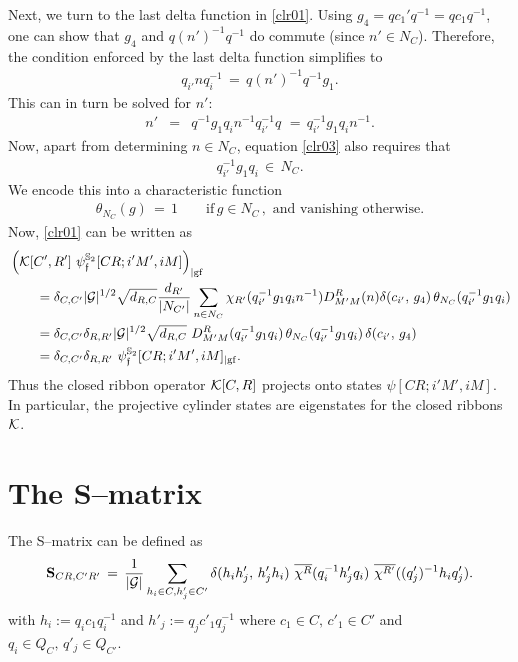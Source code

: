 \documentclass[nofootinbib,superscriptaddress,eqsecnum,tightenlines,11pt]{revtex4-1}
\def\nn{\nonumber}
\def\q{\qquad}
\def\mG{\mathcal{G}}
\def\ba{\begin{eqnarray}}
\def\ea{\end{eqnarray}}
\begin{document}
Next, we turn to the last delta function in \eqref{clr01}. Using $g_4=qc_1'q^{-1}=qc_1q^{-1}$, one can show that $g_4$ and $q(n')^{-1}q^{-1}$ do commute (since $n' \in N_C$). Therefore, the condition enforced by the last delta function simplifies to
\ba
q_{i'}nq_i^{-1}\,=\, q (n')^{-1} q^{-1} g_1.
\ea
This can in turn be solved for $n'$:
\ba\label{clr03}
n'&=& q^{-1} g_1 q_i n^{-1} q_{i'}^{-1}  q 
\,\,=\,  q_{i'}^{-1}  g_1 q_i n^{-1}   .
\ea
Now, apart from determining $n \in N_C$,  equation \eqref{clr03} also requires that 
\ba
q_{i'}^{-1}  g_1 q_i \,\in \, N_C  .
\ea
We encode this into a characteristic function
\ba
\theta_{N_C}( g)\,=\, 1 \q \text{if} \, g\in N_C\, ,  \text{ and vanishing otherwise.}
\ea
Now, \eqref{clr01} can be written as
\begin{align}
	&\left({\cal K}[C',R']\, \,\psi^{\mathbb{S}_2}_{\mathfrak f}[CR;i'M',iM] \right)_{|{\rm gf}}\\
	&\q  = \delta_{C,C'} |\mG|^{1/2}\sqrt{d_{R,C}} \frac{ d_{R'}} {|N_{C'}|} \sum_{n \in N_C}  \chi_{R'}(  q_{i'}^{-1}  g_1 q_i n^{-1}    ) D^R_{M'M}(n)	
	\delta( c_{i'},\, g_4 ) \, \theta_{N_C} ( q_{i'}^{-1}  g_1 q_i )\nn\\
	&\q =
 \delta_{C,C'} \delta_{R,R'} |\mG|^{1/2}\sqrt{d_{R,C}}  \,\,D^R_{M'M}( q_{i'}^{-1}  g_1 q_i  ) \, \theta_{N_C} ( q_{i'}^{-1}  g_1 q_i )\, \delta( c_{i'},\, g_4 )\nn\\
 &\q =  \delta_{C,C'} \delta_{R,R'} \,\,\psi^{\mathbb{S}_2}_{\mathfrak f}[CR;i'M',iM]_{|{\rm gf}}  .
\end{align}
 Thus the closed ribbon operator ${\cal K}[C,R]$ projects onto states $\psi[CR;i'M',iM]$. In particular, the projective cylinder states are eigenstates for the closed ribbons ${\cal K}$.
 

\section{The S--matrix}\label{SmatrixR}

The S--matrix can be defined as \cite{Pasquier,Verlinde}
\ba\label{SmatrixV2}
{\bf S}_{CR,C'R'} \,=\, \frac{1}{|\cal G|}  \sum_{h_i  \in C, h'_j \in C'}  \delta( h_i h'_j, \, h'_j h_i) \, \, \overline{\chi^R}( q_i^{-1}h'_jq_i) \,\, \overline{ \chi^{R'}} ( (q'_j)^{-1} h_i q'_j)  .
\ea
with $h_i:= q_i c_1 q_i^{-1}$ and $h'_j:= q_j c'_1 q_j^{-1}$ where $c_1 \in C, \, c'_1 \in C'$ and $q_i \in Q_C, \, q'_j \in Q_{C'}$. 
\end{document}
